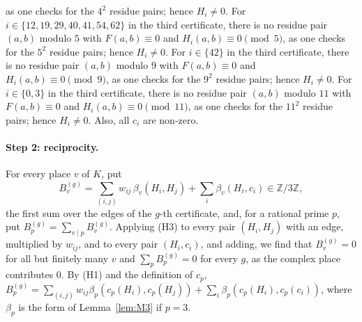 \documentclass[11pt]{article}
\newcommand{\Z}{\mathbb{Z}}
\begin{document}
as one checks for the $4^2$ residue pairs; hence $H_i\neq0$. For $i\in\{12,\allowbreak 19,\allowbreak 29,\allowbreak 40,\allowbreak 41,\allowbreak 54,\allowbreak 62\}$ in the third certificate, there is no residue pair $(a,b)$ modulo $5$ with $F(a,b)\equiv0$ and $H_i(a,b)\equiv0\pmod{5}$, as one checks for the $5^2$ residue pairs; hence $H_i\neq0$. For $i\in\{42\}$ in the third certificate, there is no residue pair $(a,b)$ modulo $9$ with $F(a,b)\equiv0$ and $H_i(a,b)\equiv0\pmod{9}$, as one checks for the $9^2$ residue pairs; hence $H_i\neq0$. For $i\in\{0,\allowbreak 3\}$ in the third certificate, there is no residue pair $(a,b)$ modulo $11$ with $F(a,b)\equiv0$ and $H_i(a,b)\equiv0\pmod{11}$, as one checks for the $11^2$ residue pairs; hence $H_i\neq0$. Also, all $c_i$ are non-zero.

\paragraph{Step 2: reciprocity.} For every place $v$ of $K$, put
\begin{equation}\label{eq:B}
B^{(g)}_v=\sum_{(i,j)}w_{ij}\,\beta_v(H_i,H_j)+\sum_i\beta_v(H_i,c_i)\in\Z/3\Z,
\end{equation}
the first sum over the edges of the $g$-th certificate, and, for a rational prime $p$, put $B^{(g)}_p=\sum_{v\mid p}B^{(g)}_v$. Applying (H3) to every pair $(H_i,H_j)$ with an edge, multiplied by $w_{ij}$, and to every pair $(H_i,c_i)$, and adding, we find that $B^{(g)}_v=0$ for all but finitely many $v$ and $\sum_pB^{(g)}_p=0$ for every $g$, as the complex place contributes $0$. By (H1) and the definition of $c_p$, $B^{(g)}_p=\sum_{(i,j)}w_{ij}\beta_p(c_p(H_i),c_p(H_j))+\sum_i\beta_p(c_p(H_i),c_p(c_i))$, where $\beta_p$ is the form of Lemma~\ref{lem:M3} if $p=3$.
\end{document}
